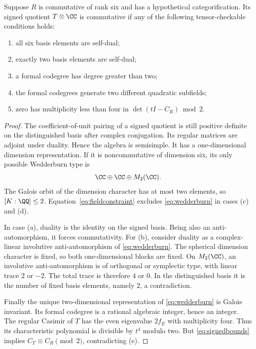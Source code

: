 \begin{proposition}\label{prop:descent}
Suppose $R$ is commutative of rank six and has a hypothetical
categorification. Its signed quotient $T\otimes\CC$ is commutative if
any of the following tensor-checkable conditions holds:
\begin{enumerate}[label=(\alph*)]
\item all six basis elements are self-dual;
\item exactly two basis elements are self-dual;
\item a formal codegree has degree greater than two;
\item the formal codegrees generate two different quadratic subfields;
\item zero has multiplicity less than four in
$\det(tI-C_R)\bmod2$.
\end{enumerate}
\end{proposition}
\begin{proof}
The coefficient-of-unit pairing of a signed quotient is still positive
definite on the distinguished basis after complex conjugation. Its
regular matrices are adjoint under duality. Hence the algebra is
semisimple. It has a one-dimensional dimension representation. If it
is noncommutative of dimension six, its only possible Wedderburn type is
\begin{equation}\label{eq:wedderburn}
 \CC\oplus\CC\oplus M_2(\CC).
\end{equation}
The Galois orbit of the dimension character has at most two elements,
so $[K:\QQ]\le2$. Equation~\eqref{eq:fieldconstraint} excludes
\eqref{eq:wedderburn} in cases (c) and (d).

In case (a), duality is the identity on the signed basis. Being also an
anti-automorphism, it forces commutativity. For (b), consider duality as
a complex-linear involutive anti-automorphism of
\eqref{eq:wedderburn}. The spherical dimension character is fixed, so
both one-dimensional blocks are fixed. On $M_2(\CC)$, an involutive
anti-automorphism is of orthogonal or symplectic type, with linear trace
$2$ or $-2$. The total trace is therefore $4$ or $0$. In the distinguished
basis it is the number of fixed basis elements, namely $2$, a
contradiction.

Finally the unique two-dimensional representation of
\eqref{eq:wedderburn} is Galois invariant. Its formal codegree is a
rational algebraic integer, hence an integer. The regular Casimir of
$T$ has the even eigenvalue $2f_E$ with multiplicity four. Thus its
characteristic polynomial is divisible by $t^4$ modulo two. But
\eqref{eq:signedbounds} implies $C_T\equiv C_R\pmod2$, contradicting
(e).
\end{proof}

